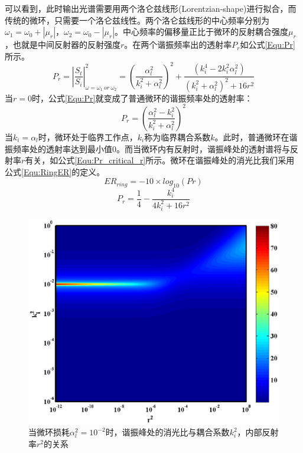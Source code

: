 可以看到，此时输出光谱需要用两个洛仑兹线形(Lorentzian-shape)进行拟合，而传统的微环，只需要一个洛仑兹线性。两个洛仑兹线形的中心频率分别为$\omega_1 = \omega_0+|\mu_r|$，$\omega_2=\omega_0-|\mu_r|$。中心频率的偏移量正比于微环的反射耦合强度$\mu_r$，也就是中间反射器的反射强度$r$。在两个谐振频率出的透射率$P_r$如公式\ref{Equ:Pr}所示。
\begin{equation}
\label{Equ:Pr}
P_r = \left|\frac{S_t}{S_i}\right|^2_{\omega = \omega_1~or~\omega_2}= \left(\frac{\alpha_l^2}{k_i^2+\alpha_l^2}\right)^2+\frac{(k_i^4-2k_i^2\alpha_l^2)}{(k_i^2+\alpha_l^2)^2+16r^2}
\end{equation}
当$r=0$时，公式\ref{Equ:Pr}就变成了普通微环的谐振频率处的透射率：
\begin{equation}
\label{Equ:Pr_no_r}
P_r=\left(\frac{\alpha_l^2-k_i^2}{k_i^2+\alpha_l^2}\right)^2
\end{equation}
当$k_i = \alpha_l$时，微环处于临界工作点，$k_i$称为临界耦合系数$k$。此时，普通微环在谐振频率处的透射率达到最小值0。而当微环内有反射时，谐振峰处的透射谱将与反射率$r$有关，如公式\ref{Equ:Pr_critical_r}所示。微环在谐振峰处的消光比我们采用公式\ref{Equ:RingER}的定义。
\begin{equation}
\label{Equ:RingER}
ER_{ring}=-10 \times log_{10}(Pr)
\end{equation}
\begin{equation}
\label{Equ:Pr_critical_r}
P_r=\frac{1}{4}-\frac{k_i^4}{4k_i^2+16r^2}
\end{equation}
\begin{figure}[htb]
	\centering
	\includegraphics[width=12cm]{./Pictures/chapt5_r_k_Ex_alpha1e-2.eps}
	\caption{当微环损耗$\alpha_l^2= 10^{-2}$时，谐振峰处的消光比与耦合系数$k_i^2$，内部反射率$r^2$的关系}
	\label{chapt5_r_k_Ex_alpha1e-2}
\end{figure}
